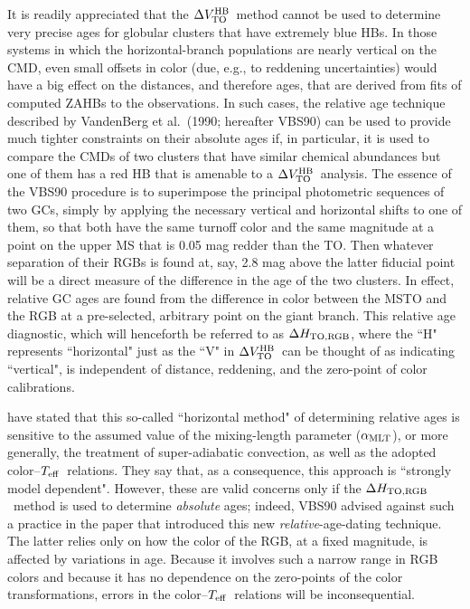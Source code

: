 \documentclass[12pt,preprint]{aastex}
\newcommand\teff{{T_{\rm eff}}}
\newcommand\amlt{{\alpha_{\rm MLT}}}
\newcommand\delv{\Delta V^{\rm HB}_{\rm TO}}
\newcommand\delc{\Delta H_{\rm TO,RGB}}
\begin{document}
It is readily appreciated that the $\delv$\ method cannot be used to determine
very precise ages for globular clusters that have extremely blue HBs.  In those
systems in which the horizontal-branch populations are nearly vertical on the
CMD, even small offsets in color (due, e.g., to reddening uncertainties) would
have a big effect on the distances, and therefore ages, that are derived from
fits of computed ZAHBs to the observations.  In such cases, the relative age
technique described by VandenBerg et al.~(1990; hereafter VBS90) can be used to
provide much tighter constraints on their absolute ages if, in particular, it
is used to compare the CMDs of two clusters that have similar chemical
abundances but one of them has a red HB that is amenable to a $\delv$\ analysis.
The essence of the VBS90 procedure is to superimpose the principal photometric
sequences of two GCs, simply by applying the necessary vertical and horizontal
shifts to one of them, so that both have the same turnoff color and the same
magnitude at a point on the upper MS that is 0.05 mag redder than the TO.  Then
whatever separation of their RGBs is found at, say, 2.8 mag above the latter
fiducial point will be a direct measure of the difference in the age of the two
clusters.  In effect, relative GC ages are found from the difference in color
between the MSTO and the RGB at a pre-selected, arbitrary point on the giant
branch.  This relative age diagnostic, which will henceforth be referred to as
$\delc$, where the ``H" represents ``horizontal" just as the ``V" in
$\delv$\ can be thought of as indicating ``vertical", is independent of
distance, reddening, and the zero-point of color calibrations.

\citet[][also see MF09]{mca10} have stated that this so-called ``horizontal
method" of determining relative ages is sensitive to the assumed value of the
mixing-length parameter ($\amlt$), or more generally, the treatment
of super-adiabatic convection, as well as the adopted color--$\teff$\ relations.
They say that, as a consequence, this approach is ``strongly model dependent".
However, these are valid concerns only if the $\delc$\ method is used to
determine {\it absolute} ages; indeed, VBS90 advised against such a practice in
the paper that introduced this new {\it relative}-age-dating technique.  The
latter relies only on how the color of the RGB, at a fixed magnitude, is
affected by variations in age.  Because it involves such a narrow range in RGB
colors and because it has no dependence on the zero-points of the color
transformations, errors in the color--$\teff$\ relations will be
inconsequential.
\end{document}
